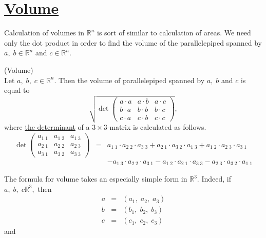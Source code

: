 \documentclass[color=black,11pt]{elegantpaper}
\begin{document}
\section{\href{https://en.wikipedia.org/wiki/Volume}{Volume}}
Calculation of volumes in $\mathbb{R}^n$ is sort of similar to calculation of areas. We need only the dot product in order to find the volume of the parallelepiped spanned by $a,\;b \in \mathbb{R}^n$ and $c\in \mathbb{R}^n.$
\begin{definition}
(Volume)\\
Let $a,\;b,\; c\in \mathbb{R}^n.$ Then the volume of parallelepiped spanned by $a,\;b$ and $c$ is equal to
\begin{equation*}
\sqrt{\det\left( \begin{array}{ccc}
             a\cdot a& a\cdot b & a \cdot c\\
             b\cdot a& b\cdot b & b \cdot c\\
             c\cdot a& c\cdot b & c \cdot c
           \end{array} \right)},
\end{equation*}
where \href{https://en.wikipedia.org/wiki/Determinant}{the determinant} of a $3 \times 3$-matrix is calculated as follows.
\begin{eqnarray*}
\det \left( \begin{array}{ccc}
a_{1\; 1}& a_{1\; 2} & a_{1\; 3}\\
a_{2\; 1} & a_{2\; 2}& a_{2\; 3}\\ 
a_{3\; 1} & a_{3\; 2}& a_{3\; 3} 
\end{array} \right) &=& a_{1\; 1} \cdot a_{2\; 2}\cdot a_{3\; 3} + a_{2\; 1} \cdot a_{3\; 2} \cdot  a_{1\; 3} + a_{1\; 2} \cdot a_{2\; 3} \cdot a_{3\; 1} \\
&&-a_{1\; 3} \cdot  a_{2\; 2} \cdot a_{3\; 1}  -  a_{1\; 2} \cdot a_{2\; 1} \cdot a_{3\; 3} - a_{2\; 3}\cdot a_{3\; 2} \cdot a_{1\; 1}
\end{eqnarray*}
\end{definition}
The formula for volume takes an especially simple form in $\mathbb{R}^3.$  Indeed, if $a,\;b,\;c  \mathbb{R}^3,$ then
\begin{eqnarray*}
a&=&(a_1,\; a_2,\; a_3)\\
b&=&(b_1,\; b_2,\; b_3)\\
c&=&(c_1,\; c_2,\; c_3)
\end{eqnarray*}
and
\end{document}
